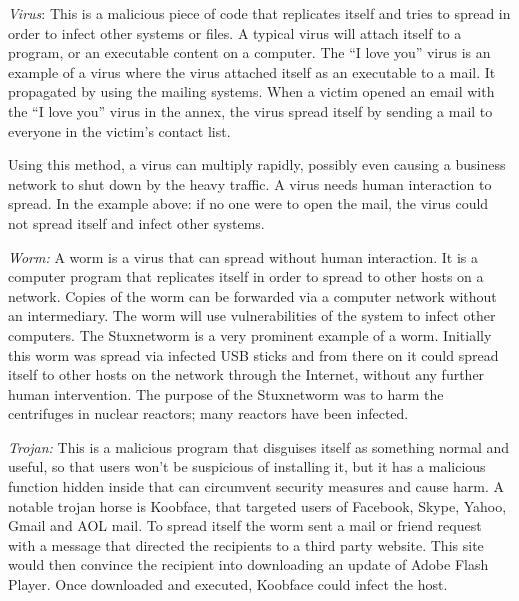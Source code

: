 % 
 
\begin{description}
\item \textit{Virus}: This is a malicious piece of code that replicates itself and tries to spread in order  to infect other systems or files. A typical virus will attach itself to a program, or an executable content on a computer. The ``I love you'' virus is an example of a virus where the virus attached itself as an executable to a mail. It propagated by using the mailing systems. When a victim opened an email with the ``I love you'' virus in the annex, the virus spread itself by sending a mail to everyone in the victim's contact list. 

Using this method, a virus can multiply rapidly, possibly even causing a business network to shut down by the heavy traffic. A virus needs human interaction to spread. In the example above: if no one were to open the mail, the virus could not spread itself and infect other systems.

\item \textit{Worm:} A worm is a virus that can spread without human interaction. It is a computer program that replicates itself in order to spread to other hosts on a network. Copies of the worm can be forwarded via a computer network without an intermediary. The worm will use vulnerabilities of the system to infect other computers.
The Stuxnetworm is a very prominent example of a worm. Initially this worm was spread via infected USB sticks and from there on it could spread itself to other hosts on the network through the Internet, without any further human intervention. The purpose of the Stuxnetworm was to harm the centrifuges in nuclear reactors; many reactors have been infected.  

\item \textit{Trojan:} This is a malicious program that disguises itself as something normal and useful, so that users won't be suspicious of installing it, but it has a malicious function hidden inside that can circumvent security measures and cause harm.  A notable trojan horse is Koobface, that targeted users of Facebook, Skype, Yahoo, Gmail and AOL mail. To spread itself the worm sent a mail or friend request with a message that directed the recipients to a third party website. This site would then convince the recipient into downloading an update of Adobe Flash Player. Once downloaded and executed, Koobface could infect the host.

\end{description}
